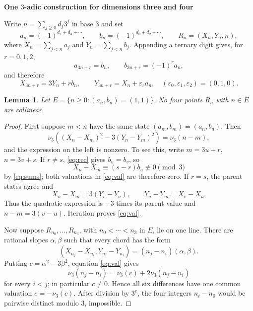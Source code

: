 \documentclass[11pt]{article}
\newtheorem*{lemma}{Lemma}
\newcommand{\vthree}{\nu_3}
\begin{document}
\begin{center}
{\Large\bfseries One $3$-adic construction for dimensions three and four}
\end{center}

Write $n=\sum_{j\ge0}d_j3^j$ in base $3$ and set
\[
 a_n=(-1)^{d_1+d_3+\cdots},\qquad
 b_n=(-1)^{d_0+d_2+\cdots},\qquad
 R_n=(X_n,Y_n,n),
\]
where $X_n=\sum_{j<n}a_j$ and $Y_n=\sum_{j<n}b_j$.  Appending a ternary
digit gives, for $r=0,1,2$,
\begin{equation}\label{eq:rec}
 a_{3n+r}=b_n,\qquad b_{3n+r}=(-1)^r a_n,
\end{equation}
and therefore
\begin{equation}\label{eq:sums}
 X_{3n+r}=3Y_n+r b_n,\qquad
 Y_{3n+r}=X_n+\varepsilon_r a_n,
 \quad(\varepsilon_0,\varepsilon_1,\varepsilon_2)=(0,1,0).
\end{equation}

\begin{lemma}\label{lem:core}
Let $E=\{n\ge0:(a_n,b_n)=(1,1)\}$.  No four points $R_n$ with $n\in E$
are collinear.
\end{lemma}
\begin{proof}
First suppose $m<n$ have the same state $(a_m,b_m)=(a_n,b_n)$.  Then
\begin{equation}\label{eq:val}
 \vthree\!\left((X_n-X_m)^2-3(Y_n-Y_m)^2\right)=\vthree(n-m),
\end{equation}
and the expression on the left is nonzero.  To see this, write
$m=3u+r$, $n=3v+s$.  If $r\ne s$, \eqref{eq:rec} gives $b_u=b_v$, so
\[
 X_n-X_m\equiv(s-r)b_u\not\equiv0\pmod3
\]
by \eqref{eq:sums}; both valuations in \eqref{eq:val} are therefore zero.
If $r=s$, the parent states agree and
\[
 X_n-X_m=3(Y_v-Y_u),\qquad Y_n-Y_m=X_v-X_u.
\]
Thus the quadratic expression is $-3$ times its parent value and
$n-m=3(v-u)$.  Iteration proves \eqref{eq:val}.

Now suppose $R_{n_0},\ldots,R_{n_3}$, with $n_0<\cdots<n_3$ in $E$, lie
on one line.  There are rational slopes $\alpha,\beta$ such that every
chord has the form
\[
 (X_{n_j}-X_{n_i},Y_{n_j}-Y_{n_i})
   =(n_j-n_i)(\alpha,\beta).
\]
Putting $c=\alpha^2-3\beta^2$, equation \eqref{eq:val} gives
\[
 \vthree(n_j-n_i)=\vthree(c)+2\vthree(n_j-n_i)
\]
for every $i<j$; in particular $c\ne0$.  Hence all six differences have
one common valuation $e= -\vthree(c)$.  After division by $3^e$, the four integers
$n_i-n_0$ would be pairwise distinct modulo $3$, impossible.
\end{proof}
\end{document}
